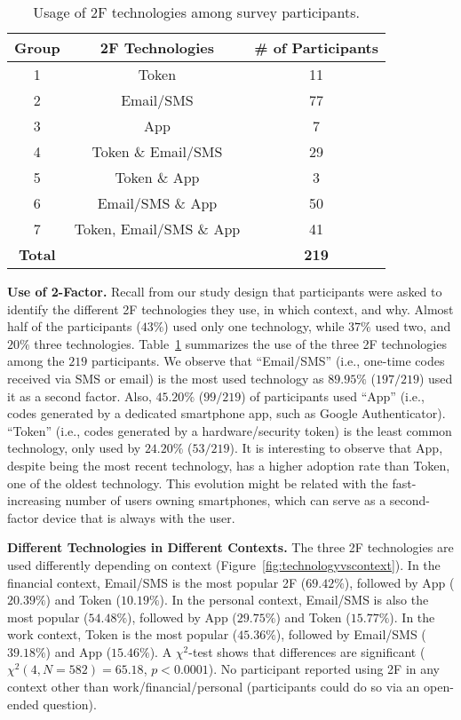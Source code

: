 \documentclass[conference]{IEEEtran}
\newcommand{\descr}[1]{\vspace{0.25cm} \noindent \textbf{#1}}
\begin{document}
\begin{table}
\begin{center}
\small
\begin{tabular}{| c | c | c |}
  \hline                        
  \textbf{Group} & \textbf{2F Technologies} & \textbf{\# of Participants} \\
  \hline    
  1 & Token & 11 \\\hline  
  2 & Email/SMS & 77 \\\hline  
  3 & App & 7 \\\hline  
  4 & Token \& Email/SMS & 29 \\\hline  
  5 & Token \& App & 3 \\\hline  
  6 & Email/SMS \& App & 50 \\\hline  
  7 & Token, Email/SMS \& App & 41 \\\hline  
  \textbf{Total} & & \textbf{219}\\
    \hline
\end{tabular}
\end{center}
\vspace{0.2cm}
\caption{Usage of 2F technologies among survey participants.\label{tab:usage}}
\vspace{-0.2cm}
 \end{table}
 

\descr{Use of 2-Factor.}
Recall from our study design that participants were asked to identify the different 2F technologies they use, in which context, and why. Almost half of the participants ($43\%$) used only one technology, while $37\%$ used two, and $20\%$ three technologies.
Table~\ref{tab:usage} summarizes the use of the three 2F technologies among the $219$ participants. We observe that ``Email/SMS'' (i.e., one-time codes received via SMS or email) is the most used technology as $89.95\%$ ($197/219$) used it as a second factor. Also, $45.20\%$ ($99/219$) of participants used ``App'' (i.e., codes generated by a dedicated smartphone app, such as Google Authenticator). ``Token'' (i.e., codes generated by a hardware/security token) is the least common technology, only used by $24.20\%$ ($53/219$). 
It is interesting to observe that App, despite being the most recent technology, has a higher adoption rate than Token, one of the oldest technology. This evolution might be related with the fast-increasing number of users owning smartphones, which can serve as a second-factor device that is always with the user.


\descr{Different Technologies in Different Contexts.}
The three 2F technologies are used differently depending on context (Figure~\ref{fig:technologyvscontext}). In the financial context, Email/SMS is the most popular 2F ($69.42\%$), followed by App ($20.39\%$) and Token ($10.19\%$). In the personal context, Email/SMS is also the most popular ($54.48\%$), followed by App ($29.75\%$) and Token ($15.77\%$). In the work context, Token is the most popular ($45.36\%$), followed by Email/SMS ($39.18\%$) and App ($15.46\%$). A $\chi^2$-test shows that differences are significant ($\chi^2(4, N=582)=65.18$, $p<0.0001$). No participant reported using 2F in any context other than work/financial/personal (participants could do so via an open-ended question).
\end{document}
